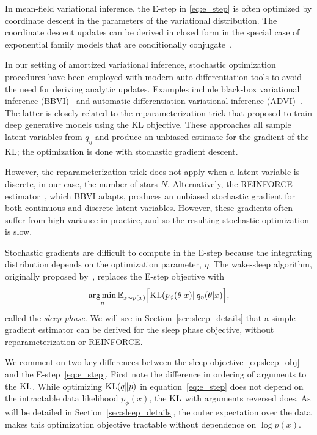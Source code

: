In mean-field variational inference, the E-step in \eqref{eq:e_step} is often optimized by coordinate descent in the parameters of the variational distribution. 
The coordinate descent updates can be derived in closed form in the special case of exponential family models that are conditionally conjugate~\cite{Blei_2017_vi_review}. 

In our setting of amortized variational inference, stochastic 
optimization procedures have been employed with modern 
auto-differentiation tools to avoid the need for deriving 
analytic updates. Examples include black-box variational inference (BBVI)~\cite{ranganath2013black} 
and automatic-differentiation variational inference (ADVI)~\cite{kucukelbir2016automatic}. The latter 
is closely related to the reparameterization trick that \cite{kingma2013autoencoding, rezende2014stochastic} proposed to train deep generative models using the KL objective. 
These approaches all sample latent variables from $q_\eta$ and produce an unbiased estimate 
for the gradient of the KL; the optimization is done with stochastic gradient descent. 

However, the reparameterization trick does not apply when a latent variable is discrete, in our case, the number of stars $N$. Alternatively, the REINFORCE estimator~\cite{Williams1992reinforce}, which BBVI adapts, produces an unbiased stochastic gradient for both continuous and discrete latent variables. However, these gradients often suffer from high variance in practice, and so the resulting stochastic optimization is slow. 

Stochastic gradients are difficult to compute in the E-step because the integrating distribution depends on the optimization parameter, $\eta$. 
The wake-sleep algorithm, originally proposed by~\cite{Hinton1995wake_sleep}, replaces the 
E-step objective with 
\begin{align}
    \operatorname*{arg\,min}_{\eta} \mathbb{E}_{x \sim p(x)}\Big[\textrm{KL}(p_\phi(\theta | x) \| q_\eta(\theta | x)\Big]
    \label{eq:sleep_obj},
\end{align}
called the {\itshape sleep phase}. We will see in Section~\ref{sec:sleep_details} that a simple gradient estimator can be derived for the sleep phase objective, without 
reparameterization or REINFORCE. 

We comment on two key differences between the sleep objective~\eqref{eq:sleep_obj} and the E-step~\eqref{eq:e_step}. First note the difference in ordering of arguments to the $\textrm{KL}$. 
While optimizing $\textrm{KL}(q\|p)$ in equation~\eqref{eq:e_step} does not depend on the intractable 
data likelihood $p_\phi(x)$, the $\textrm{KL}$ with arguments reversed does. 
As will be detailed in Section~\ref{sec:sleep_details}, the outer expectation over the data makes this optimization objective tractable without dependence on $\log p(x)$. 

